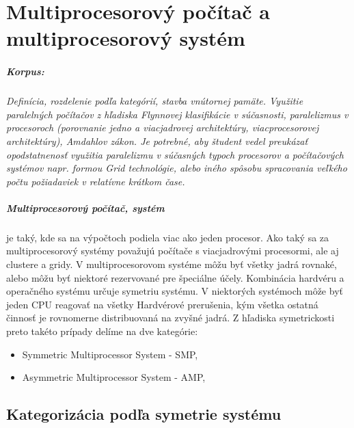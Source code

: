 \documentclass[11pt,a4paper]{report}
\begin{document}
 


\chapter{Multiprocesorový počítač a multiprocesorový systém}
\paragraph{Korpus:} \textit{Definícia, rozdelenie podľa kategórií, stavba vnútornej pamäte. Využitie paralelných počítačov z hľadiska Flynnovej klasifikácie v súčasnosti, paralelizmus v procesoroch (porovnanie jedno a viacjadrovej architektúry, viacprocesorovej architektúry), Amdahlov zákon. Je potrebné, aby študent vedel preukázať opodstatnenosť využitia paralelizmu v súčasných typoch procesorov a počítačových systémov napr. formou Grid technológie, alebo iného spôsobu spracovania veľkého počtu požiadaviek v relatívne krátkom čase. }

\paragraph{Multiprocesorový počítač, systém} je taký, kde sa na výpočtoch podiela viac ako jeden procesor. Ako taký sa za multiprocesorový systémy považujú počítače s viacjadrovými procesormi, ale aj clustere a gridy. V multiprocesorovom systéme môžu byť všetky jadrá rovnaké, alebo môžu byť niektoré rezervované pre špeciálne účely. Kombinácia hardvéru a operačného systému určuje symetriu systému. V niektorých systémoch môže byť jeden CPU reagovať na všetky Hardvérové prerušenia, kým všetka ostatná činnosť je rovnomerne distribuovaná na zvyšné jadrá. Z hľadiska symetrickosti preto takéto prípady delíme na dve  kategórie:
\begin{itemize}
\item Symmetric Multiprocessor System - SMP,
\item Asymmetric Multiprocessor System - AMP,
\end{itemize}

\section{Kategorizácia podľa symetrie systému}
\end{document}
